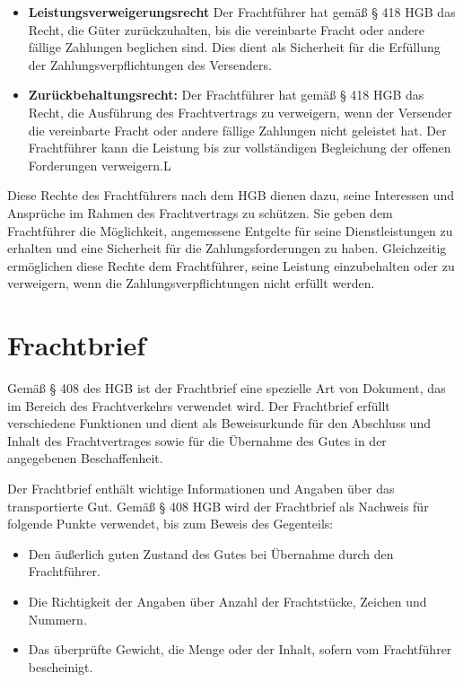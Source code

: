 \begin{itemize}
    \item \textbf{Leistungsverweigerungsrecht} Der Frachtführer hat gemäß § 418 \ac{HGB} das Recht, die Güter zurückzuhalten, bis die vereinbarte Fracht oder andere fällige Zahlungen beglichen sind. Dies dient als Sicherheit für die Erfüllung der Zahlungsverpflichtungen des Versenders.
    \item \textbf{Zurückbehaltungsrecht:} Der Frachtführer hat gemäß § 418 \ac{HGB} das Recht, die Ausführung des Frachtvertrags zu verweigern, wenn der Versender die vereinbarte Fracht oder andere fällige Zahlungen nicht geleistet hat. Der Frachtführer kann die Leistung bis zur vollständigen Begleichung der offenen Forderungen verweigern.L
\end{itemize}
Diese Rechte des Frachtführers nach dem \ac{HGB} dienen dazu, seine Interessen und Ansprüche im Rahmen des Frachtvertrags zu schützen. Sie geben dem Frachtführer die Möglichkeit, angemessene Entgelte für seine Dienstleistungen zu erhalten und eine Sicherheit für die Zahlungsforderungen zu haben. Gleichzeitig ermöglichen diese Rechte dem Frachtführer, seine Leistung einzubehalten oder zu verweigern, wenn die Zahlungsverpflichtungen nicht erfüllt werden.
\section{Frachtbrief}

Gemäß § 408 des \ac{HGB} ist der Frachtbrief eine spezielle Art von Dokument, das im Bereich des Frachtverkehrs verwendet wird. Der Frachtbrief erfüllt verschiedene Funktionen und dient als Beweisurkunde für den Abschluss und Inhalt des Frachtvertrages sowie für die Übernahme des Gutes in der angegebenen Beschaffenheit.

Der Frachtbrief enthält wichtige Informationen und Angaben über das transportierte Gut. Gemäß § 408 \ac{HGB} wird der Frachtbrief als Nachweis für folgende Punkte verwendet, bis zum Beweis des Gegenteils:

\begin{itemize}
    \item Den äußerlich guten Zustand des Gutes bei Übernahme durch den Frachtführer.
    \item Die Richtigkeit der Angaben über Anzahl der Frachtstücke, Zeichen und Nummern.
    \item Das überprüfte Gewicht, die Menge oder der Inhalt, sofern vom Frachtführer bescheinigt.
\end{itemize}

